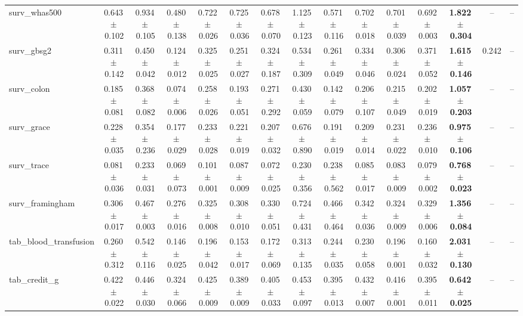 \documentclass[8pt]{extarticle}
\begin{document}
\begin{longtable}{l*{14}{c}}
surv\_whas500 & 0.643\,$\pm$\,0.102 & 0.934\,$\pm$\,0.105 & 0.480\,$\pm$\,0.138 & 0.722\,$\pm$\,0.026 & 0.725\,$\pm$\,0.036 & 0.678\,$\pm$\,0.070 & 1.125\,$\pm$\,0.123 & 0.571\,$\pm$\,0.116 & 0.702\,$\pm$\,0.018 & 0.701\,$\pm$\,0.039 & 0.692\,$\pm$\,0.003 & \textbf{1.822\,$\pm$\,0.304} & -- & -- \\
surv\_gbsg2 & 0.311\,$\pm$\,0.142 & 0.450\,$\pm$\,0.042 & 0.124\,$\pm$\,0.012 & 0.325\,$\pm$\,0.025 & 0.251\,$\pm$\,0.027 & 0.324\,$\pm$\,0.187 & 0.534\,$\pm$\,0.309 & 0.261\,$\pm$\,0.049 & 0.334\,$\pm$\,0.046 & 0.306\,$\pm$\,0.024 & 0.371\,$\pm$\,0.052 & \textbf{1.615\,$\pm$\,0.146} & 0.242 & -- \\
surv\_colon & 0.185\,$\pm$\,0.081 & 0.368\,$\pm$\,0.082 & 0.074\,$\pm$\,0.006 & 0.258\,$\pm$\,0.026 & 0.193\,$\pm$\,0.051 & 0.271\,$\pm$\,0.292 & 0.430\,$\pm$\,0.059 & 0.142\,$\pm$\,0.079 & 0.206\,$\pm$\,0.107 & 0.215\,$\pm$\,0.049 & 0.202\,$\pm$\,0.019 & \textbf{1.057\,$\pm$\,0.203} & -- & -- \\
surv\_grace & 0.228\,$\pm$\,0.035 & 0.354\,$\pm$\,0.236 & 0.177\,$\pm$\,0.029 & 0.233\,$\pm$\,0.028 & 0.221\,$\pm$\,0.019 & 0.207\,$\pm$\,0.032 & 0.676\,$\pm$\,0.890 & 0.191\,$\pm$\,0.019 & 0.209\,$\pm$\,0.014 & 0.231\,$\pm$\,0.022 & 0.236\,$\pm$\,0.010 & \textbf{0.975\,$\pm$\,0.106} & -- & -- \\
surv\_trace & 0.081\,$\pm$\,0.036 & 0.233\,$\pm$\,0.031 & 0.069\,$\pm$\,0.073 & 0.101\,$\pm$\,0.001 & 0.087\,$\pm$\,0.009 & 0.072\,$\pm$\,0.025 & 0.230\,$\pm$\,0.356 & 0.238\,$\pm$\,0.562 & 0.085\,$\pm$\,0.017 & 0.083\,$\pm$\,0.009 & 0.079\,$\pm$\,0.002 & \textbf{0.768\,$\pm$\,0.023} & -- & -- \\
surv\_framingham & 0.306\,$\pm$\,0.017 & 0.467\,$\pm$\,0.003 & 0.276\,$\pm$\,0.016 & 0.325\,$\pm$\,0.008 & 0.308\,$\pm$\,0.010 & 0.330\,$\pm$\,0.051 & 0.724\,$\pm$\,0.431 & 0.466\,$\pm$\,0.464 & 0.342\,$\pm$\,0.036 & 0.324\,$\pm$\,0.009 & 0.329\,$\pm$\,0.006 & \textbf{1.356\,$\pm$\,0.084} & -- & -- \\
tab\_blood\_transfusion & 0.260\,$\pm$\,0.312 & 0.542\,$\pm$\,0.116 & 0.146\,$\pm$\,0.025 & 0.196\,$\pm$\,0.042 & 0.153\,$\pm$\,0.017 & 0.172\,$\pm$\,0.069 & 0.313\,$\pm$\,0.135 & 0.244\,$\pm$\,0.035 & 0.230\,$\pm$\,0.058 & 0.196\,$\pm$\,0.001 & 0.160\,$\pm$\,0.032 & \textbf{2.031\,$\pm$\,0.130} & -- & -- \\
tab\_credit\_g & 0.422\,$\pm$\,0.022 & 0.446\,$\pm$\,0.030 & 0.324\,$\pm$\,0.066 & 0.425\,$\pm$\,0.009 & 0.389\,$\pm$\,0.009 & 0.405\,$\pm$\,0.033 & 0.453\,$\pm$\,0.097 & 0.395\,$\pm$\,0.013 & 0.432\,$\pm$\,0.007 & 0.416\,$\pm$\,0.001 & 0.395\,$\pm$\,0.011 & \textbf{0.642\,$\pm$\,0.025} & -- & -- \\

\end{longtable}
\end{document}
